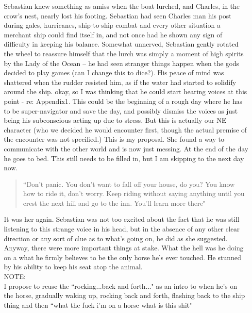 Sebastian knew something as amiss when the boat
lurched, and Charles, in the crow's nest, nearly lost his footing. Sebastian had
seen Charles man his post during gales, hurricanes, ship-to-ship combat and
every other situation a merchant ship could find itself in, and not once had he
shown any sign of difficulty in keeping his balance. Somewhat unnerved,
Sebastian gently rotated the wheel to reassure himself that the lurch was simply
a moment of high spirits by the Lady of the Ocean -- he had seen stranger things
happen when the gods decided to play games \R(can I change this to dice?)\E. His peace of mind was shattered
when the rudder resisted him, as if the water had started to solidify around the
ship. \R okay, so I was thinking that he could start hearing voices at this
point - re: Appendix1. This could be the beginning of a rough day where he has to be
super-navigator and save the day, and possibly dismiss the voices as just being his
subconscious acting up due to stress. But this is actually our NE character (who
we decided he would encounter first, though the actual premise of the encounter
was not specified.) This is my proposal. She found a way to communicate with the
other world and is now just messing. At the end of the day he goes to bed. This
still needs to be filled in, but I am skipping to the next day now. \\ \E

\begin{quote}
``Don't panic. You don't want to fall off your house, do you? You know how to
ride it, don't worry. Keep riding without saying anything until you crest the
next hill and go to the inn. You'll learn more there"
\end{quote}
It was her again. Sebastian was not too excited about the fact that he was still
listening to this strange voice in his head, but in the absence of any other clear
direction or any sort of clue as to what's going on, he did as she suggested.
Anyway, there were more important things at stake. What the hell was
he doing on a what he firmly believes to be the only horse he's ever touched. 
He stunned by his ability to keep his seat atop the animal.  \\

NOTE: \\

I propose to reuse the ``rocking...back and forth..." as an intro to when he's on
the horse, gradually waking up, rocking back and forth, flashing back to the
ship thing and then ``what the fuck i'm on a horse what is this shit"\\ 
